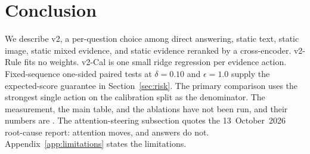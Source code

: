 \section{Conclusion}
We describe \method{} v2, a per-question choice among direct answering, static text, static image, static mixed evidence, and static evidence reranked by a cross-encoder.
v2-Rule fits no weights.
v2-Cal is one small ridge regression per evidence action.
Fixed-sequence one-sided paired tests at $\delta=0.10$ and $\epsilon=1.0$ supply the expected-score guarantee in Section~\ref{sec:risk}.
The primary comparison uses the strongest single action on the calibration split as the denominator.
The measurement, the main table, and the ablations have not been run, and their numbers are \ph{}.
The attention-steering subsection quotes the 13~October~2026 root-cause report: attention moves, and answers do not.
Appendix~\ref{app:limitations} states the limitations.
